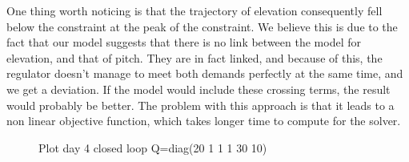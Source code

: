 One thing worth noticing is that the trajectory of elevation consequently fell below the constraint at the peak of the constraint. We believe this is due to the fact that our model suggests that there is no link between the model for elevation, and that of pitch. They are in fact linked, and because of this, the regulator doesn't manage to meet both demands perfectly at the same time, and we get a deviation. If the model would include these crossing terms, the result would probably be better. The problem with this approach is that it leads to a non linear objective function, which takes longer time to compute for the solver.
\begin{figure}[htb]
	\centering
	\caption{Plot day 4 closed loop Q=diag(20 1 1 1 30 10)}
	\label{fig:day4_cl_plot_20_1_1_1_30_10}
\end{figure}




